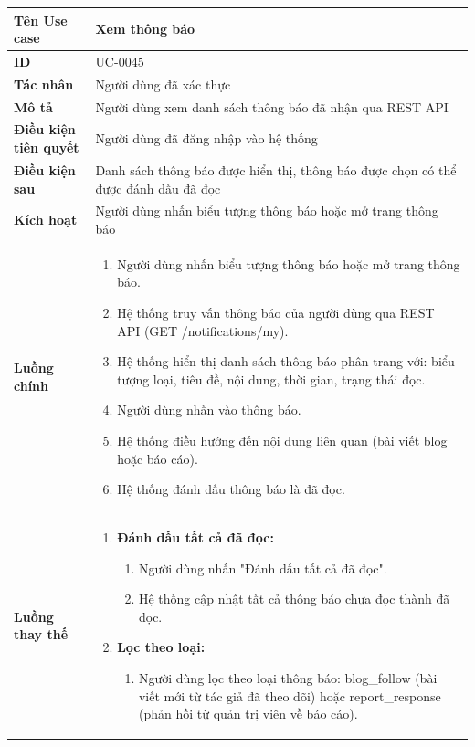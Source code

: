 {
\renewcommand{\arraystretch}{1.5}

\begin{tabularx}{\textwidth}{|>{\raggedright\arraybackslash}X|>{\raggedright\arraybackslash}X|}
\hline
\textbf{Tên Use case} & Xem thông báo \\
\hline
\textbf{ID} & UC-0045 \\
\hline
\textbf{Tác nhân} & Người dùng đã xác thực \\
\hline
\textbf{Mô tả} & Người dùng xem danh sách thông báo đã nhận qua REST API \\
\hline
\textbf{Điều kiện tiên quyết} & Người dùng đã đăng nhập vào hệ thống \\
\hline
\textbf{Điều kiện sau} & Danh sách thông báo được hiển thị, thông báo được chọn có thể được đánh dấu đã đọc \\
\hline
\textbf{Kích hoạt} & Người dùng nhấn biểu tượng thông báo hoặc mở trang thông báo \\
\hline
\textbf{Luồng chính} &
\begin{enumerate}
    \item Người dùng nhấn biểu tượng thông báo hoặc mở trang thông báo.
    \item Hệ thống truy vấn thông báo của người dùng qua REST API (GET /notifications/my).
    \item Hệ thống hiển thị danh sách thông báo phân trang với: biểu tượng loại, tiêu đề, nội dung, thời gian, trạng thái đọc.
    \item Người dùng nhấn vào thông báo.
    \item Hệ thống điều hướng đến nội dung liên quan (bài viết blog hoặc báo cáo).
    \item Hệ thống đánh dấu thông báo là đã đọc.
\end{enumerate} \\
\hline
\textbf{Luồng thay thế} &
\begin{enumerate}
    \item \textbf{Đánh dấu tất cả đã đọc:}
    \begin{enumerate}
        \item[3A.] Người dùng nhấn "Đánh dấu tất cả đã đọc".
        \item[4A.] Hệ thống cập nhật tất cả thông báo chưa đọc thành đã đọc.
    \end{enumerate}
    \item \textbf{Lọc theo loại:}
    \begin{enumerate}
        \item[2B.] Người dùng lọc theo loại thông báo: blog\_follow (bài viết mới từ tác giả đã theo dõi) hoặc report\_response (phản hồi từ quản trị viên về báo cáo).

\end{enumerate}
\end{enumerate}
\end{tabularx}}
